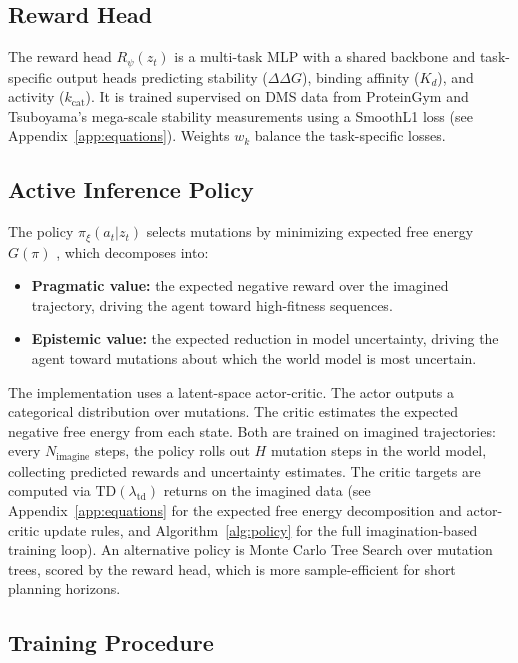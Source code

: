 \documentclass[12pt, a4paper]{article}
\begin{document}
\subsection{Reward Head}

The reward head $R_\psi(z_t)$ is a multi-task MLP with a shared backbone and task-specific output heads predicting stability ($\Delta\Delta G$), binding affinity ($K_d$), and activity ($k_\text{cat}$). It is trained supervised on DMS data from ProteinGym and Tsuboyama's mega-scale stability measurements using a SmoothL1 loss (see Appendix~\ref{app:equations}). Weights $w_k$ balance the task-specific losses.

\subsection{Active Inference Policy}

The policy $\pi_\xi(a_t | z_t)$ selects mutations by minimizing expected free energy $G(\pi)$ \citep{parr2022active}, which decomposes into:
\begin{itemize}
    \item \textbf{Pragmatic value:} the expected negative reward over the imagined trajectory, driving the agent toward high-fitness sequences.
    \item \textbf{Epistemic value:} the expected reduction in model uncertainty, driving the agent toward mutations about which the world model is most uncertain.
\end{itemize}

The implementation uses a latent-space actor-critic. The actor outputs a categorical distribution over mutations. The critic estimates the expected negative free energy from each state. Both are trained on imagined trajectories: every $N_\text{imagine}$ steps, the policy rolls out $H$ mutation steps in the world model, collecting predicted rewards and uncertainty estimates. The critic targets are computed via $\text{TD}(\lambda_\text{td})$ returns on the imagined data (see Appendix~\ref{app:equations} for the expected free energy decomposition and actor-critic update rules, and Algorithm~\ref{alg:policy} for the full imagination-based training loop). An alternative policy is Monte Carlo Tree Search over mutation trees, scored by the reward head, which is more sample-efficient for short planning horizons.

\subsection{Training Procedure}
\end{document}
